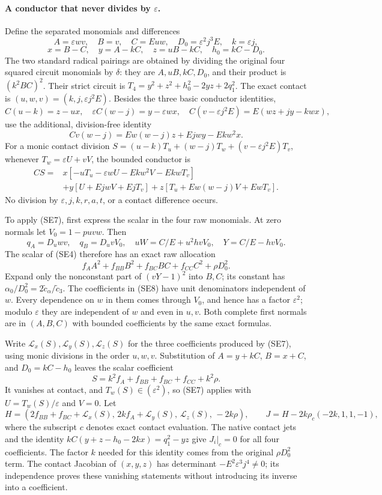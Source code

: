 \paragraph{A conductor that never divides by $\varepsilon$.}
Define the separated monomials and differences
\[
 A=\varepsilon wv,\quad B=v,\quad C=Euw,\quad
 D_0=\varepsilon^2j^3E,\quad k=\varepsilon j,
\]
\[
 x=B-C,\quad y=A-kC,\quad z=uB-kC,\quad h_0=kC-D_0.
\]
The two standard radical pairings are obtained by dividing the original
four squared circuit monomials by $\delta$: they are
$A,uB,kC,D_0$, and their product is $(k^2BC)^2$.
Their strict circuit is
$T_4=y^2+z^2+h_0^2-2yz+2q_1^2$.
The exact contact is $(u,w,v)=(k,j,\varepsilon j^2E)$.
Besides the three basic conductor identities,
\[
 C(u-k)=z-ux,\quad
 \varepsilon C(w-j)=y-\varepsilon wx,\quad
 C(v-\varepsilon j^2E)=E(wz+jy-kwx),                \tag{SE5}
\]
use the additional, division-free identity
\[
 C v(w-j)=Ew(w-j)z+Ejw y-Ekw^2x.                    \tag{SE6}
\]
For a monic contact division
$S=(u-k)T_u+(w-j)T_w+(v-\varepsilon j^2E)T_v$,
whenever $T_w=\varepsilon U+vV$, the bounded conductor is
\[
 \begin{aligned}
 CS={}&x[-uT_u-\varepsilon wU-Ekw^2V-EkwT_v]\\
 &+y[U+EjwV+EjT_v]
 +z[T_u+Ew(w-j)V+EwT_v].
 \end{aligned}                                      \tag{SE7}
\]
No division by $\varepsilon,j,k,r,a,t$, or a contact difference occurs.

To apply (SE7), first express the scalar in the four raw monomials.
At zero normals let
$V_0=1-puv w$. Then
\[
 q_A=D_u wv,\quad q_B=D_uvV_0,\quad
 uW=C/E+u^2hvV_0,\quad Y=C/E-hvV_0.
\]
The scalar of (SE4) therefore has an exact raw allocation
\[
 f_AA^2+f_{BB}B^2+f_{BC}BC+f_{CC}C^2+\rho D_0^2.     \tag{SE8}
\]
Expand only the nonconstant part of $(vY-1)^2$ into $B,C$; its constant
has $\alpha_0/D_0^2=2\widetilde c_\alpha/\widetilde c_3$.
The coefficients in (SE8) have unit denominators independent of $w$.
Every dependence on $w$ in them comes through $V_0$, and hence has a
factor $\varepsilon^2$; modulo $\varepsilon$ they are independent of
$w$ and even in $u,v$. Both complete first normals are in $(A,B,C)$
with bounded coefficients by the same exact formulas.

Write $\mathcal L_x(S),\mathcal L_y(S),\mathcal L_z(S)$ for the three
coefficients produced by (SE7), using monic divisions in the order
$u,w,v$. Substitution of $A=y+kC$, $B=x+C$, and $D_0=kC-h_0$
leaves the scalar coefficient
\[
 S=k^2f_A+f_{BB}+f_{BC}+f_{CC}+k^2\rho.
\]
It vanishes at contact, and $T_w(S)\in(\varepsilon^2)$, so (SE7)
applies with $U=T_w(S)/\varepsilon$ and $V=0$. Let
\[
 H=(2f_{BB}+f_{BC}+\mathcal L_x(S),\,
       2kf_A+\mathcal L_y(S),\,\mathcal L_z(S),\,-2k\rho),
 \qquad J=H-2k\rho_c(-2k,1,1,-1),
\]
where the subscript $c$ denotes exact contact evaluation. The native
contact jets and the identity $kC(y+z-h_0-2kx)=q_1^2-yz$ give
$J_i|_c=0$ for all four coefficients. The factor $k$ needed for this
identity comes from the original $\rho D_0^2$ term.
The contact Jacobian of $(x,y,z)$ has determinant
$-E^2\varepsilon^3j^4\ne0$; its independence proves these vanishing
statements without introducing its inverse into a coefficient.

